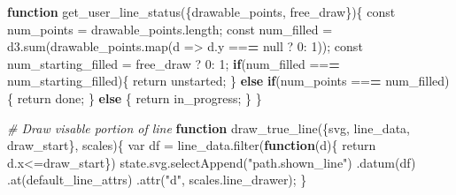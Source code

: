 \documentclass[print]{nuthesis}
\newenvironment{Shaded}{\begin{snugshade}}{\end{snugshade}}
\newcommand{\AttributeTok}[1]{\textcolor[rgb]{0.77,0.63,0.00}{#1}}
\newcommand{\CommentTok}[1]{\textcolor[rgb]{0.56,0.35,0.01}{\textit{#1}}}
\newcommand{\ControlFlowTok}[1]{\textcolor[rgb]{0.13,0.29,0.53}{\textbf{#1}}}
\newcommand{\DecValTok}[1]{\textcolor[rgb]{0.00,0.00,0.81}{#1}}
\newcommand{\ErrorTok}[1]{\textcolor[rgb]{0.64,0.00,0.00}{\textbf{#1}}}
\newcommand{\FunctionTok}[1]{\textcolor[rgb]{0.00,0.00,0.00}{#1}}
\newcommand{\NormalTok}[1]{#1}
\newcommand{\OtherTok}[1]{\textcolor[rgb]{0.56,0.35,0.01}{#1}}
\newcommand{\SpecialCharTok}[1]{\textcolor[rgb]{0.00,0.00,0.00}{#1}}
\newcommand{\StringTok}[1]{\textcolor[rgb]{0.31,0.60,0.02}{#1}}
\begin{document}
\begin{Shaded}
\begin{Highlighting}[]
\ControlFlowTok{function} \FunctionTok{get\_user\_line\_status}\NormalTok{(\{drawable\_points, free\_draw\})\{}
\NormalTok{  const num\_points }\OtherTok{=}\NormalTok{ drawable\_points.length;}
\NormalTok{  const num\_filled }\OtherTok{=} \FunctionTok{d3.sum}\NormalTok{(}\FunctionTok{drawable\_points.map}\NormalTok{(}\AttributeTok{d =}\SpecialCharTok{\textgreater{}}\NormalTok{ d.y }\SpecialCharTok{==}\ErrorTok{=}\NormalTok{ null ? }\DecValTok{0}\SpecialCharTok{:} \DecValTok{1}\NormalTok{));}
\NormalTok{  const num\_starting\_filled }\OtherTok{=}\NormalTok{ free\_draw ? }\DecValTok{0}\SpecialCharTok{:} \DecValTok{1}\NormalTok{;}
  \ControlFlowTok{if}\NormalTok{(num\_filled }\SpecialCharTok{==}\ErrorTok{=}\NormalTok{ num\_starting\_filled)\{}
\NormalTok{    return }\StringTok{\textquotesingle{}unstarted\textquotesingle{}}\NormalTok{;}
\NormalTok{  \} }\ControlFlowTok{else} \ControlFlowTok{if}\NormalTok{(num\_points }\SpecialCharTok{==}\ErrorTok{=}\NormalTok{ num\_filled)\{}
\NormalTok{    return }\StringTok{\textquotesingle{}done\textquotesingle{}}\NormalTok{;}
\NormalTok{  \} }\ControlFlowTok{else}\NormalTok{ \{}
\NormalTok{    return }\StringTok{\textquotesingle{}in\_progress\textquotesingle{}}\NormalTok{;}
\NormalTok{  \}}
\NormalTok{\}}

\CommentTok{\# Draw visable portion of line}
\ControlFlowTok{function} \FunctionTok{draw\_true\_line}\NormalTok{(\{svg, line\_data, draw\_start\}, scales)\{}
\NormalTok{  var df }\OtherTok{=} \FunctionTok{line\_data.filter}\NormalTok{(}\ControlFlowTok{function}\NormalTok{(d)\{ return d.x}\SpecialCharTok{\textless{}=}\NormalTok{draw\_start\})}
  \FunctionTok{state.svg.selectAppend}\NormalTok{(}\StringTok{"path.shown\_line"}\NormalTok{)}
  \FunctionTok{.datum}\NormalTok{(df)}
  \FunctionTok{.at}\NormalTok{(default\_line\_attrs)}
  \FunctionTok{.attr}\NormalTok{(}\StringTok{"d"}\NormalTok{, scales.line\_drawer);}
\NormalTok{\}}


\end{Highlighting}
\end{Shaded}
\end{document}
